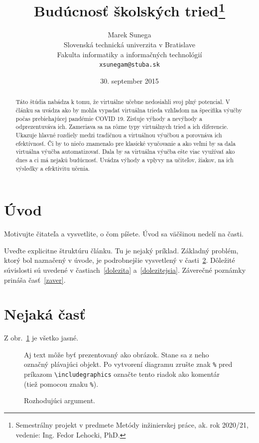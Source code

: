 \documentclass[10pt,twoside,slovak,a4paper]{article}
\title{Budúcnosť školských tried\thanks{Semestrálny projekt v predmete Metódy inžinierskej práce, ak. rok 2020/21, vedenie: Ing. Fedor Lehocki, PhD.}} %
\author{Marek Sunega\\[2pt]
	{\small Slovenská technická univerzita v Bratislave}\\
	{\small Fakulta informatiky a informačných technológií}\\
	{\small \texttt{xsunegam@stuba.sk}}
	}
\date{\small 30. september 2015} %
\begin{document}
\maketitle

\begin{abstract}
	Táto štúdia nabádza k tomu, že virtuálne učebne nedosiahli svoj plný potencial. V článku sa 
	uvádza ako by mohla vypadať virtuálna trieda vzhľadom na špecifika výučby počas 
	prebiehajúcej pandémie COVID 19. Zisťuje výhody a nevýhody a odprezentuváva ich. Zameriava 
	sa na rôzne typy virtuálnych tried a ich diferencie. Ukazuje hlavné rozdiely medzi tradičnou 
	a virtuálnou výučbou a porovnáva ich efektívnosť. Či by to niečo znamenalo pre klasické vyučovanie 
	a ako veľmi by sa dala virtuálna výučba automatizovať. Dala by sa virtuálna výučba ešte viac 
	využívať ako dnes a ci má nejakú budúcnosť. Uvádza výhody a vplyvy na učiteľov, žiakov, na ich 
	výsledky a efektivitu učenia.
\end{abstract}



\section{Úvod}

Motivujte čitateľa a vysvetlite, o čom píšete. Úvod sa väčšinou nedelí na časti.

Uveďte explicitne štruktúru článku. Tu je nejaký príklad.
Základný problém, ktorý bol naznačený v úvode, je podrobnejšie vysvetlený v časti~\ref{nejaka}.
Dôležité súvislosti sú uvedené v častiach~\ref{dolezita} a~\ref{dolezitejsia}.
Záverečné poznámky prináša časť~\ref{zaver}.



\section{Nejaká časť} \label{nejaka}

Z obr.~\ref{f:rozhod} je všetko jasné. 

\begin{figure}[tbh]
\centering
Aj text môže byť prezentovaný ako obrázok. Stane sa z neho označný plávajúci objekt. Po vytvorení diagramu zrušte znak \texttt{\%} pred príkazom \verb|\includegraphics| označte tento riadok ako komentár (tiež pomocou znaku \texttt{\%}).
\caption{Rozhodujúci argument.}
\label{f:rozhod}
\end{figure}
\end{document}
